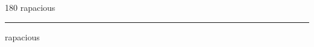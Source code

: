 
\begin{frame}
\begin{center}
\begin{turn}{180}
{\fontsize{2.5cm}{1em}\selectfont rapacious}
\end{turn}
\vspace{1em}\par  
\hrule
\vspace{1em}\par  
{\fontsize{2.5cm}{1em}\selectfont rapacious}
\end{center}
\end{frame}
